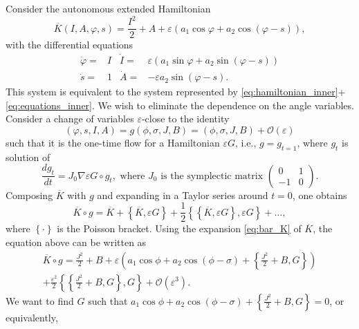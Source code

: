 \documentclass[a4paper,10pt]{article}
\theoremstyle{definition}
\begin{document}
Consider the autonomous extended Hamiltonian
\begin{equation}
\overline{K}(I,A,\varphi,s) = \frac{I^2}{2} + A + \varepsilon\left(a_{1}\cos\varphi + a_{2}\cos(\varphi -s)\right),\label{eq:bar_K}
\end{equation}
with the differential equations
\begin{align*}
\dot{\varphi} =& I &\dot{I} =&\varepsilon\left(a_{1}\sin\varphi + a_{2}\sin(\varphi-s)\right)\\
\dot{s} =& 1  &\dot{A} =& -\varepsilon a_{2}\sin(\varphi-s).
\end{align*}
This system is equivalent to the system represented by \eqref{eq:hamiltonian_inner}+\eqref{eq:equations_inner}.
We wish to eliminate the dependence on the angle variables.
Consider a change of variables $\varepsilon$-close to the identity $$(\varphi,s , I , A ) = g(\phi , \sigma , J , B) = (\phi , \sigma , J , B) + \mathcal{O}(\varepsilon)$$
such that it is the one-time flow for a Hamiltonian $\varepsilon G$, i.e.,  $g = g_{t=1}$, where $g_t$ is solution of
\begin{equation*}
\frac{dg_t}{dt} = J_0\nabla\varepsilon G\circ g_t, \text{ where } J_0 \text{ is the symplectic matrix }\begin{pmatrix}
 0&1 \\
 -1&0
\end{pmatrix}.
\end{equation*}
Composing $\overline{K}$ with $g$ and expanding in a Taylor series around $t=0$, one obtains
\begin{equation*}
\overline{K}\circ g = \overline{K} + \left\{\overline{K},\varepsilon G\right\} + \frac{1}{2}\left\{\left\{\overline{K},\varepsilon G\right\} , \varepsilon G\right\} + \dots,
\end{equation*}
where $\left\{\cdot\right\}$ is the Poisson bracket.
Using the expansion \eqref{eq:bar_K} of $\overline{K}$, the equation above can be written as
\begin{equation}
\begin{split}
\overline{K}\circ g = \frac{J^2}{2} + B + \varepsilon\left( a_{1}\cos\phi + a_{2}\cos(\phi-\sigma) + \left\{\frac{J^2}{2} + B ,G\right\} \right) \\+ \frac{\varepsilon^2}{2}\left\{\left\{\frac{J^2}{2} + B,G\right\},G\right\} + \mathcal{O}(\varepsilon^3).\label{eq:exp_K}
\end{split}
\end{equation}
We want to find $G$ such that $a_{1}\cos\phi + a_{2}\cos(\phi-\sigma) + \left\{\frac{J^2}{2} + B ,G\right\}=0$, or equivalently,
\end{document}
